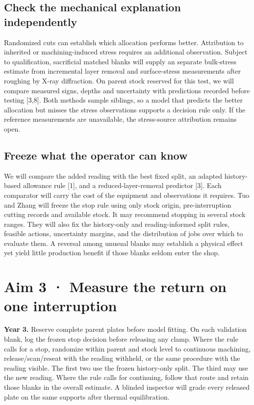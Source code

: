\documentclass[11pt,letterpaper]{article}
\begin{document}
\subsection*{Check the mechanical explanation independently}

Randomized cuts can establish which allocation performs better. Attribution to inherited or machining-induced stress requires an additional observation. Subject to qualification, sacrificial matched blanks will supply an separate bulk-stress estimate from incremental layer removal and surface-stress measurements after roughing by X-ray diffraction. On parent stock reserved for this test, we will compare measured signs, depths and uncertainty with predictions recorded before testing [3,8]. Both methods sample siblings, so a model that predicts the better allocation but misses the stress observations supports a decision rule only. If the reference measurements are unavailable, the stress-source attribution remains open.

\subsection*{Freeze what the operator can know}

We will compare the added reading with the best fixed split, an adapted history-based allowance rule [1], and a reduced-layer-removal predictor [3]. Each comparator will carry the cost of the equipment and observations it requires. Tuo and Zhang will freeze the stop rule using only stock origin, pre-interruption cutting records and available stock. It may recommend stopping in several stock ranges. They will also fix the history-only and reading-informed split rules, feasible actions, uncertainty margins, and the distribution of jobs over which to evaluate them. A reversal among unusual blanks may establish a physical effect yet yield little production benefit if those blanks seldom enter the shop.

\newpage

\section*{Aim 3 · Measure the return on one interruption}

\textbf{Year 3.} Reserve complete parent plates before model fitting. On each validation blank, log the frozen stop decision before releasing any clamp. Where the rule calls for a stop, randomize within parent and stock level to continuous machining, release/scan/reseat with the reading withheld, or the same procedure with the reading visible. The first two use the frozen history-only split. The third may use the new reading. Where the rule calls for continuing, follow that route and retain those blanks in the overall estimate. A blinded inspector will grade every released plate on the same supports after thermal equilibration.
\end{document}
